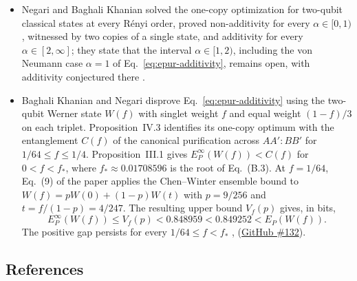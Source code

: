 \begin{itemize}
  \item Negari and Baghali Khanian solved the one-copy optimization for two-qubit
classical states at every R\'enyi order, proved non-additivity for every
$\alpha\in[0,1)$, witnessed by two copies of a single state, and additivity
for every $\alpha\in[2,\infty]$; they state that the interval
$\alpha\in[1,2)$, including the von Neumann case $\alpha=1$ of
Eq.~\eqref{eq:epur-additivity}, remains open, with additivity conjectured
there .

  \item Baghali Khanian and Negari disprove Eq.~\eqref{eq:epur-additivity} using the two-qubit Werner state $W(f)$ with singlet weight $f$ and equal weight $(1-f)/3$ on each triplet. Proposition~IV.3 identifies its one-copy optimum with the entanglement $C(f)$ of the canonical purification across $AA':BB'$ for $1/64\leq f\leq 1/4$. Proposition~III.1 gives $E_P^\infty(W(f))<C(f)$ for $0<f<f_*$, where $f_*\approx 0.01708596$ is the root of Eq.~(B.3). At $f=1/64$, Eq.~(9) of the paper applies the Chen--Winter ensemble bound to $W(f)=p W(0)+(1-p)W(t)$ with $p=9/256$ and $t=f/(1-p)=4/247$. The resulting upper bound $V_f(p)$ gives, in bits,
\begin{equation}
  E_P^\infty(W(f))\leq V_f(p)<0.848959<0.849252<E_P(W(f)).
  \label{eq:epur-werner-gap}
\end{equation}
The positive gap persists for every $1/64\leq f<f_*$ , 
(\href{https://github.com/Naixu-Guo/quantum-open-problems/issues/132}{GitHub \#132}).
\end{itemize}

\subsection*{References}

